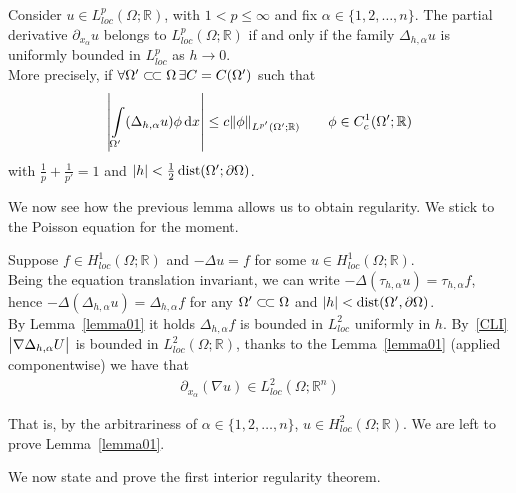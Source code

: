 \begin{lem}[]\label{lemma01}
    Consider \( u\in L_{loc}^{p}(\Omega ;\mathbb{R}) \), with \( 1< p \leq  \infty  \) and fix \( \alpha \in \{ 1,2,\ldots,n \} \). The partial derivative \( \partial_{x_{\alpha }}u \) belongs to \( L_{loc}^{p}(\Omega ;\mathbb{R}) \) if and only if the family \( \Delta _{h,\alpha }u \) is uniformly bounded in \( L_{loc}^{p} \) as \( h \to 0 \).\\
    More precisely, if \( \forall \Omega' \ssubset \Omega \, \exists C=C(\Omega') \) such that
    \begin{gather}
        \abs{\int\limits_{\Omega'}^{} (\Delta _{h,\alpha }u) \phi  \dd{x}}\leq c\norm{\phi }_{L^{p'}(\Omega';\mathbb{R})} \qquad \phi \in C_{c}^{1}(\Omega';\mathbb{R})
    \end{gather}
    with \( \frac{1}{p}+\frac{1}{p'}=1 \) and \( \abs{h}< \frac{1}{2} \operatorname{dist}(\Omega';\partial \Omega )  \).
\end{lem}
We now see how the previous lemma allows us to obtain regularity. We stick to the Poisson equation for the moment. \par
Suppose \( f \in H_{loc}^{1}(\Omega ;\mathbb{R})  \) and \( -\Delta u=f \) for some \( u \in H_{loc}^{1}(\Omega ; \mathbb{R})  \).\\
Being the equation translation invariant, we can write \( -\Delta (\tau _{h,\alpha }u) = \tau _{h, \alpha }f \), hence \( -\Delta (\Delta _{h, \alpha }u) = \Delta _{h, \alpha }f \) for any \( \Omega' \ssubset \Omega  \) and \( \abs{h}< \operatorname{dist}(\Omega', \partial \Omega )  \). \\
By Lemma~\ref{lemma01} it holds \( \Delta _{h, \alpha }f \) is bounded in \( L_{loc}^{2} \) uniformly in \( h \). By~\eqref{CLI} \( \abs{\nabla \Delta _{h, \alpha }U} \) is bounded in \( L_{loc}^{2}(\Omega ;\mathbb{R})  \), thanks to the Lemma~\ref{lemma01} (applied componentwise) we have that
\begin{gather}
    \partial_{x_{\alpha }}(\nabla u) \in L_{loc}^{2}(\Omega ;\mathbb{R}^{n})
\end{gather}

That is, by the arbitrariness of \( \alpha \in \{ 1,2,\ldots,n \} \), \( u \in H_{loc}^{2}(\Omega ;\mathbb{R})  \). We are left to prove Lemma~\ref{lemma01}.\\
\par
We now state and prove the first interior regularity theorem.

